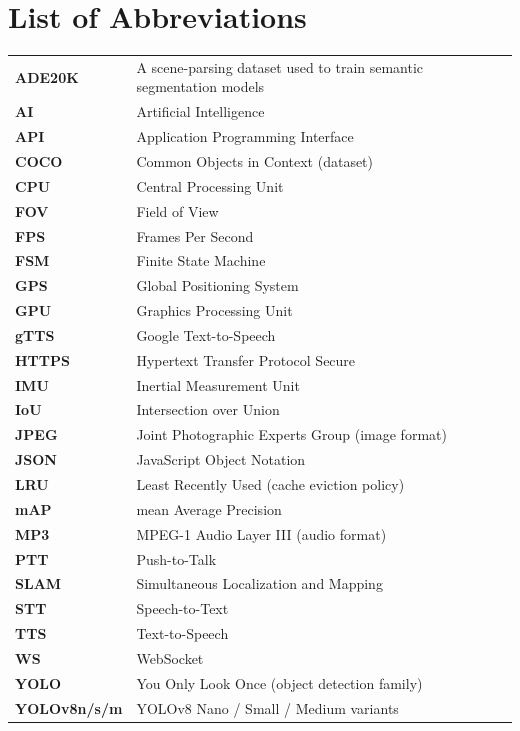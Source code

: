\chapter*{List of Abbreviations}

\begin{longtable}{p{3cm} p{11cm}}
\textbf{ADE20K} & A scene-parsing dataset used to train semantic segmentation models \\
\textbf{AI}     & Artificial Intelligence \\
\textbf{API}    & Application Programming Interface \\
\textbf{COCO}   & Common Objects in Context (dataset) \\
\textbf{CPU}    & Central Processing Unit \\
\textbf{FOV}    & Field of View \\
\textbf{FPS}    & Frames Per Second \\
\textbf{FSM}    & Finite State Machine \\
\textbf{GPS}    & Global Positioning System \\
\textbf{GPU}    & Graphics Processing Unit \\
\textbf{gTTS}   & Google Text-to-Speech \\
\textbf{HTTPS}  & Hypertext Transfer Protocol Secure \\
\textbf{IMU}    & Inertial Measurement Unit \\
\textbf{IoU}    & Intersection over Union \\
\textbf{JPEG}   & Joint Photographic Experts Group (image format) \\
\textbf{JSON}   & JavaScript Object Notation \\
\textbf{LRU}    & Least Recently Used (cache eviction policy) \\
\textbf{mAP}    & mean Average Precision \\
\textbf{MP3}    & MPEG-1 Audio Layer III (audio format) \\
\textbf{PTT}    & Push-to-Talk \\
\textbf{SLAM}   & Simultaneous Localization and Mapping \\
\textbf{STT}    & Speech-to-Text \\
\textbf{TTS}    & Text-to-Speech \\
\textbf{WS}     & WebSocket \\
\textbf{YOLO}   & You Only Look Once (object detection family) \\
\textbf{YOLOv8n/s/m} & YOLOv8 Nano / Small / Medium variants \\
\end{longtable}